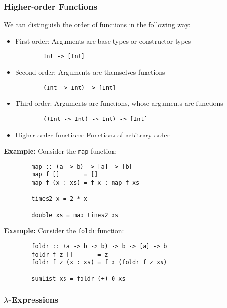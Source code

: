 \documentclass[a4paper]{extarticle}
\begin{document}
\subsubsection{Higher-order Functions}

We can distinguish the order of functions in the following way:

\begin{itemize}
    \item First order: Arguments are base types or constructor types \begin{verbatim}
        Int -> [Int]
    \end{verbatim}
    \item Second order: Arguments are themselves functions \begin{verbatim}
        (Int -> Int) -> [Int]
    \end{verbatim}
    \item Third order: Arguments are functions, whose arguments are functions \begin{verbatim}
        ((Int -> Int) -> Int) -> [Int]
    \end{verbatim}
    \item Higher-order functions: Functions of arbitrary order
\end{itemize}

\begin{ebox}
    \textbf{Example:} Consider the \verb|map| function:
    \begin{verbatim}
        map :: (a -> b) -> [a] -> [b]
        map f []       = []
        map f (x : xs) = f x : map f xs

        times2 x = 2 * x

        double xs = map times2 xs
    \end{verbatim}
\end{ebox}

\begin{ebox}
    \textbf{Example:} Consider the \verb|foldr| function:
    \begin{verbatim}
        foldr :: (a -> b -> b) -> b -> [a] -> b
        foldr f z []       = z
        foldr f z (x : xs) = f x (foldr f z xs)

        sumList xs = foldr (+) 0 xs
    \end{verbatim}
\end{ebox}

\subsubsection{\(\lambda\)-Expressions}
\end{document}
